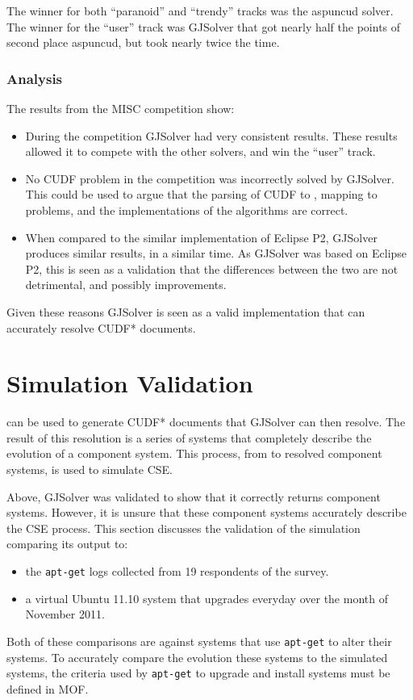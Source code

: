 The winner for both ``paranoid'' and ``trendy'' tracks was the aspuncud solver.
The winner for the ``user'' track was GJSolver that got nearly half the points of second place aspuncud, but took nearly twice the time.

\subsubsection{Analysis}
The results from the MISC competition show:
\begin{itemize}
  \item During the competition GJSolver had very consistent results.
These results allowed it to compete with the other solvers, and win the ``user'' track.
 \item No CUDF problem in the competition was incorrectly solved by GJSolver. 
 This could be used to argue that the parsing of CUDF to \modelname, mapping to \modelimpl problems, and the implementations of the algorithms are correct.
 \item When compared to the similar implementation of Eclipse P2, GJSolver produces similar results, in a similar time. 
 As GJSolver was based on Eclipse P2, this is seen as a validation that the differences between the two are not detrimental, and possibly improvements. 
\end{itemize}

Given these reasons GJSolver is seen as a valid implementation that can accurately resolve CUDF* documents.

\section{Simulation Validation}
\label{impl.validation}
\usermodel can be used to generate CUDF* documents that GJSolver can then resolve.
The result of this resolution is a series of systems that completely describe the evolution of a component system.
This process, from \usermodel to resolved component systems, is used to simulate CSE.

Above, GJSolver was validated to show that it correctly returns component systems.
However, it is unsure that these component systems accurately describe the CSE process.
This section discusses the validation of the simulation comparing its output to:
\begin{itemize}
  \item the \texttt{apt-get} logs collected from 19 respondents of the survey.
  \item a virtual Ubuntu 11.10 system that upgrades everyday over the month of November 2011.
\end{itemize}
Both of these comparisons are against systems that use \texttt{apt-get} to alter their systems.
To accurately compare the evolution these systems to the simulated systems, the criteria used by \texttt{apt-get} to upgrade and install systems must be defined in MOF.

